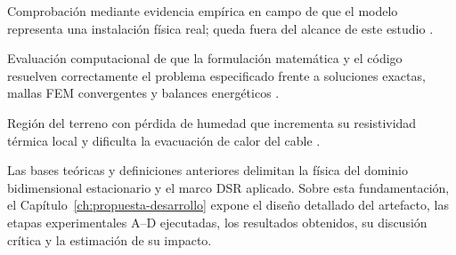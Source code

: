 \begin{description}[style=nextline,itemsep=0.5\baselineskip,parsep=0pt,topsep=0.25\baselineskip]
  \item[Validación.] Comprobación mediante evidencia empírica en campo de que el modelo representa una instalación física real; queda fuera del alcance de este estudio \parencites{cigre2022}[93--99]{cigre2025}[350--351]{gregor2013}.

  \item[Verificación.] Evaluación computacional de que la formulación matemática y el código resuelven correctamente el problema especificado frente a soluciones exactas, mallas FEM convergentes y balances energéticos \parencites{cigre2022}[3--4,93--99]{cigre2025}[350--351]{gregor2013}.

  \item[Zona seca.] Región del terreno con pérdida de humedad que incrementa su resistividad térmica local y dificulta la evacuación de calor del cable \parencites[4--6]{enescu2021}[1,6--9]{khumalo2025}[14851--14852]{fariz2026}.
\end{description}
\endgroup

Las bases teóricas y definiciones anteriores delimitan la física del dominio bidimensional estacionario y el marco DSR aplicado. Sobre esta fundamentación, el Capítulo~\ref{ch:propuesta-desarrollo} expone el diseño detallado del artefacto, las etapas experimentales A--D ejecutadas, los resultados obtenidos, su discusión crítica y la estimación de su impacto.
